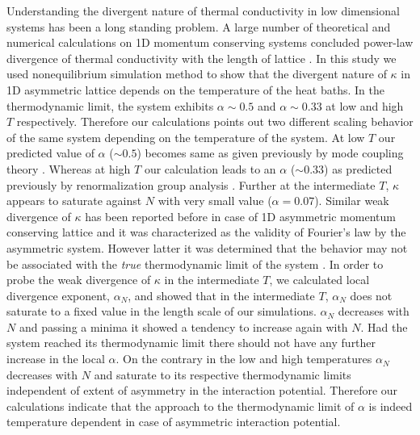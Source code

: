 \documentclass[aps,pre,reprint,groupedaddress]{revtex4-1}
\begin{document}
Understanding the divergent nature of thermal conductivity in low dimensional systems has been a long standing problem. A large number of theoretical and numerical calculations on 1D momentum conserving systems concluded power-law divergence of thermal conductivity with the length of lattice \cite{Dhar2008,Lepri2003a}. In this study we used nonequilibrium simulation method to show that the divergent nature of $\kappa$ in 1D asymmetric lattice depends on the temperature of the heat baths. In the thermodynamic limit, the system exhibits $\alpha\sim0.5$ and $\alpha\sim0.33$ at low and high $T$ respectively. Therefore our calculations points out two different scaling behavior of the same system depending on the temperature of the system. At low $T$ our predicted value of $\alpha$ ($\sim0.5$) becomes same as given previously by mode coupling theory \cite{Lee-Dadswell2005,Delfini2006,VanBeijeren2012,Mendl2013}. Whereas at high $T$ our calculation leads to an $\alpha$ ($\sim0.33$) as predicted previously by renormalization group analysis \cite{Narayan2002,Mai2006}. Further at the intermediate $T$, $\kappa$ appears to saturate against $N$ with very small value ($\alpha=0.07$). Similar weak divergence of $\kappa$ has been reported before in case of 1D asymmetric momentum conserving lattice \cite{Zhong2012a} and it was characterized as the validity of Fourier's law by the asymmetric system. However latter it was determined that the behavior may not be associated with the \textit{true} thermodynamic limit of the system \cite{Das2014,Wang2013}. In order to probe the weak divergence of $\kappa$ in the intermediate $T$,  we calculated local divergence exponent, $\alpha_N$, and showed that in the intermediate $T$, $\alpha_N$ does not saturate to a fixed value in the length scale of our simulations. $\alpha_N$ decreases with $N$ and passing a minima it showed a tendency to increase again with $N$. Had the system reached its thermodynamic limit there should not have any further increase in the local $\alpha$. On the contrary in the low and high temperatures $\alpha_N$ decreases with $N$ and saturate to its respective thermodynamic limits independent of extent of asymmetry in the interaction potential. Therefore our calculations indicate that the approach to the thermodynamic limit of $\alpha$ is indeed temperature dependent in case of asymmetric interaction potential.

\end{document}
